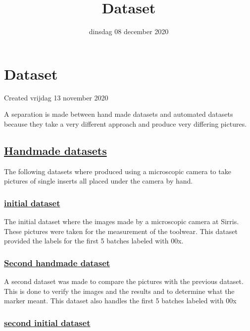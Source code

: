 \documentclass{scrartcl}
\title{Dataset}
\date{dinsdag 08 december 2020}
\author{}
\begin{document}
\maketitle

		\section{Dataset}

Created vrijdag 13 november 2020



A separation is made between hand made datasets and automated datasets because they take a very different approach and produce very differing pictures.



\subsection{\href{./Dataset/handmade_datasets.tex}{Handmade datasets}}

The following datasets where produced using a microscopic camera to take pictures of single inserts all placed under the camera by hand.



\subsubsection{\href{./Dataset/handmade_datasets/initial_dataset.tex}{initial dataset}}

	The initial dataset where the images made by a microscopic camera at Sirris. These pictures were taken for the measurement of the toolwear. This dataset provided the labels for the first 5 batches labeled with 00x.
	


\subsubsection{\href{./Dataset/handmade_datasets/Second_handmade_dataset.tex}{Second handmade dataset}}

	A second dataset was made to compare the pictures with the previous dataset. This is done to verify the images and the results and to determine 	what the marker meant. This dataset also handles the first 5 batches labeled with 00x
	


\subsubsection{\href{./Dataset/handmade_datasets/second_initial_dataset.tex}{second initial dataset}}
\end{document}
